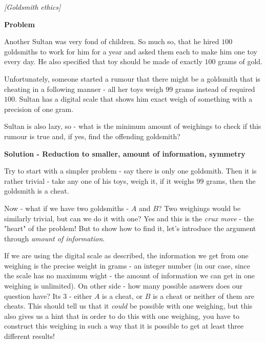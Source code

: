 
%
%



\filbreak
\begin{problem}
\textit{[Goldsmith ethics]}

\textbf{Problem}

Another Sultan was very fond of children. So much so, that he hired $100$ goldsmiths to work for him for a year and asked them each to make him one toy every day. He also specified that toy should be made of exactly $100$ grams of gold.

Unfortunately, someone started a rumour that there might be a goldsmith that is cheating in a following manner - all her toys weigh $99$ grams instead of required $100$. Sultan has a digital scale that shows him exact weigh of something with a precision of one gram. 

Sultan is also lazy, so - what is the minimum amount of weighings to check if this rumour is true and, if yes, find the offending goldsmith?

\textbf{Solution - Reduction to smaller, amount of information, symmetry}

Try to start with a simpler problem - say there is only one goldsmith. Then it is rather trivial - take any one of his toys, weigh it, if it weighs $99$ grams, then the goldsmith is a cheat.

Now - what if we have two goldsmiths - $A$ and $B$? Two weighings would be similarly trivial, but can we do it with one? Yes and this is the \textit{crux move} - the "heart" of the problem! But to show how to find it, let's introduce the argument through \textit{amount of information}.

If we are using the digital scale as described, the information we get from one weighing is the precise weight in grams - an integer number (in our case, since the scale has no maximum wight - the amount of information we can get in one weighing is unlimited). 
On other side - how many possible answers does our question have? Its $3$ - either $A$ is a cheat, or $B$ is a cheat or neither of them are cheats. This should tell us that it \textit{could} be possible with one weighing, but this also gives us a hint that in order to do this with one weighing, you have to construct this weighing in such a way that it is possible to get at least three different results! 


\end{problem}
